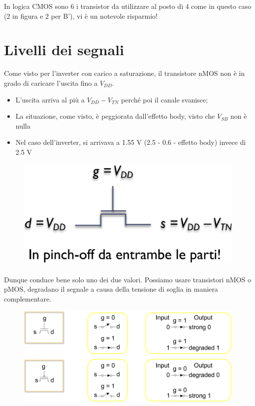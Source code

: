 In logica CMOS sono 6 i transistor da utilizzare al posto di 4 come in questo caso (2 in figura e 2 per B'), vi è un notevole risparmio!

\section{Livelli dei segnali}

Come	visto per	l'inverter con	carico a	saturazione,	il
transistore nMOS non	è in	grado di	caricare l'uscita fino a $V_{DD}$.

\begin{itemize}
    \item L'uscita arriva al	più a	$V_{DD} - V_{TN}$ perché poi	il canale svanisce;
    \item La	situazione,	come	visto,	è peggiorata dall'effetto body,	visto che $V_{SB}$ non	è nulla
    \item Nel caso dell'inverter,	si arrivava a	1.55	V (2.5 - 0.6 - effetto body)	invece di	2.5	V
\end{itemize}

\newpage
\begin{figure}[htbp]
    \centering
    \includegraphics[width=0.35\linewidth]{img/imgggg.png}
\end{figure}

\paragraph{}
Dunque conduce bene solo uno dei due valori. Possiamo usare transistori nMOS o pMOS, degradano	il	segnale	a	causa	della	tensione	di	soglia	in	 maniera	complementare.


\begin{figure}[htbp]
    \centering
    \includegraphics[width=0.7\linewidth]{img/npmos.png}
    
    
\end{figure}


